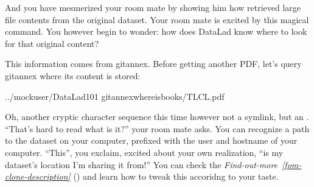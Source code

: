 \sphinxAtStartPar
And you have mesmerized your room mate by showing him how {\hyperref[\detokenize{glossary:term-git-annex}]{}}
retrieved large file contents from the original dataset.
Your room mate is excited by this magical command.
You however begin to wonder: how does DataLad know where to look for that original content?

\sphinxAtStartPar
This information comes from git\sphinxhyphen{}annex.
Before getting another PDF, let’s query git\sphinxhyphen{}annex where its content is stored:

\ignorespaces 
\def\sphinxLiteralBlockLabel{\label{\detokenize{basics/101-117-sharelocal2:index-0}}}
\begin{sphinxVerbatim}[commandchars=\\\{\}]
../mock\PYGZus{}user/DataLad\PYGZhy{}101
gitannexwhereisbooks/TLCL.pdf
\end{sphinxVerbatim}

\sphinxAtStartPar
Oh, another cryptic character sequence \sphinxhyphen{} this time however not a symlink, but an {\hyperref[\detokenize{glossary:term-annex-UUID}]{}}.
“That’s hard to read \textendash{} what is it?” your room mate asks.
You can recognize a path to the dataset on your computer, prefixed with the user and hostname of your computer.
“This”, you exclaim, excited about your own realization, “is my dataset’s location I’m sharing it from!” You can check the \textit{Find-out-more}~{\findoutmoreiconinline}\textit{\ref{fom-clone-description}} {\hyperref[\detokenize{basics/101-117-sharelocal2:fom-clone-description}]{}} () and learn how to tweak this accoridng to your taste.

